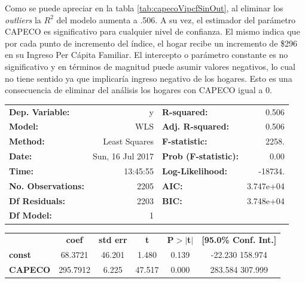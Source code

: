 Como se puede apreciar en la tabla \ref{tab:capecoVipcfSinOut}, al eliminar los \textit{outliers} la $R^2$ del modelo aumenta a .506. A su vez, el estimador del parámetro CAPECO es significativo para cualquier nivel de confianza. El mismo indica que por cada punto de incremento del índice, el hogar recibe un incremento de \$296 en su Ingreso Per Cápita Familiar. El intercepto o parámetro constante es no significativo y en términos de magnitud puede asumir valores negativos, lo cual no tiene sentido ya que implicaría ingreso negativo de los hogares. Esto es una consecuencia de eliminar del análisis los hogares con CAPECO igual a 0.

\begin{table}
	\begin{tabular}{lrlr}
		
		\textbf{Dep. Variable:}    &        y         & \textbf{  R-squared:         } &     0.506   \\
		\textbf{Model:}            &       WLS        & \textbf{  Adj. R-squared:    } &     0.506   \\
		\textbf{Method:}           &  Least Squares   & \textbf{  F-statistic:       } &     2258.   \\
		\textbf{Date:}             & Sun, 16 Jul 2017 & \textbf{  Prob (F-statistic):} &     0.00    \\
		\textbf{Time:}             &     13:45:55     & \textbf{  Log-Likelihood:    } &   -18734.   \\
		\textbf{No. Observations:} &        2205      & \textbf{  AIC:               } & 3.747e+04   \\
		\textbf{Df Residuals:}     &        2203      & \textbf{  BIC:               } & 3.748e+04   \\
		\textbf{Df Model:}         &           1      & \textbf{                     } &             \\
		
	\end{tabular}
	\begin{tabular}{lccccc}
		& \textbf{coef} & \textbf{std err} & \textbf{t} & \textbf{P$>$$|$t$|$} & \textbf{[95.0\% Conf. Int.]}  \\
		
		\textbf{const} &      68.3721  &       46.201     &     1.480  &         0.139        &       -22.230   158.974       \\
		\textbf{CAPECO}    &     295.7912  &        6.225     &    47.517  &         0.000        &       283.584   307.999       \\
		

\end{tabular}
\end{table}
